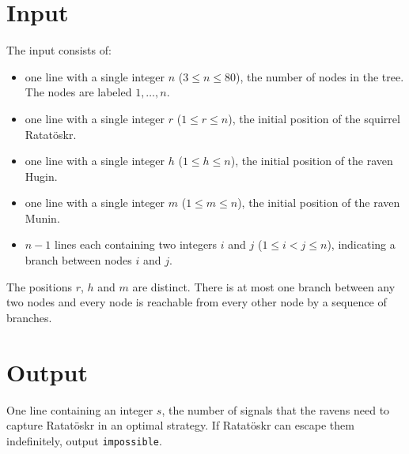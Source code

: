 \section*{Input}
The input consists of:
\begin{itemize}
	\item one line with a single integer $n$ ($3\leq n\leq 80$), the number of nodes in the tree. The nodes are labeled $1, \dots, n$.
	\item one line with a single integer $r$ ($1 \leq r \leq n$), the initial position of the squirrel Ratatöskr.
	\item one line with a single integer $h$ ($1 \leq h \leq n$), the initial position of the raven Hugin.
	\item one line with a single integer $m$ ($1 \leq m \leq n$), the initial position of the raven  Munin.
	\item $n-1$ lines each containing two integers $i$ and $j$ ($1 \leq i < j \leq n$), indicating a branch between nodes $i$ and $j$.
\end{itemize}

The positions $r$, $h$ and $m$ are distinct. There is at most one branch between any two nodes and every node is reachable from every other node by a sequence of branches.



\section*{Output}
One line containing an integer $s$, the number of signals that the ravens need to capture Ratatöskr in an optimal strategy. If Ratatöskr can escape them indefinitely, output \texttt{impossible}.
